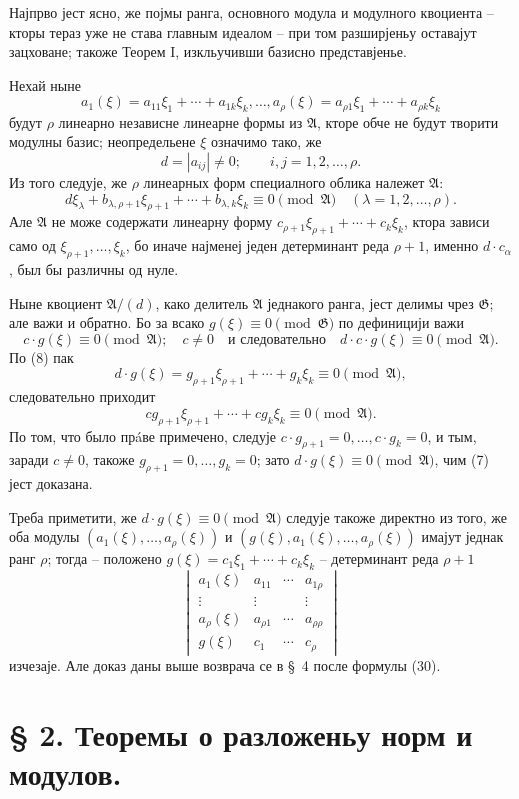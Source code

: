 \documentclass[11pt]{article}
\providecommand{\Amod}{\mathfrak A}
\providecommand{\Gmod}{\mathfrak G}
\providecommand{\zero}[1]{\equiv 0\pmod{#1}}
\begin{document}
Најпрво јест ясно, же појмы ранга, основного модула и модулного квоциента -- кторы тераз уже не става главным идеалом -- при том разширјеньу оставајут зацховане; такоже Теорем I, изкльучивши базисно представјенье.

Нехай ныне
\[
 a_1(\xi)=a_{11}\xi_1+\cdots+a_{1k}\xi_k,\ldots,
 a_\rho(\xi)=a_{\rho1}\xi_1+\cdots+a_{\rho k}\xi_k
\]
будут $\rho$ линеарно независне линеарне формы из $\Amod$, кторе обче не будут творити модулны базис; неопредельене $\xi$ означимо тако, же
\[
 d=|a_{ij}|\ne0;\qquad i,j=1,2,\ldots,\rho.
\]
Из того следује, же $\rho$ линеарных форм специалного облика належет $\Amod$:
\begin{equation}
 d\xi_\lambda+b_{\lambda,\rho+1}\xi_{\rho+1}+\cdots+b_{\lambda,k}\xi_k\zero{\Amod}
 \quad(\lambda=1,2,\ldots,\rho).
\tag{8}
\end{equation}
Але $\Amod$ не може содержати линеарну форму $c_{\rho+1}\xi_{\rho+1}+\cdots+c_k\xi_k$, ктора зависи само од $\xi_{\rho+1},\ldots,\xi_k$, бо иначе најменеј једен детерминант реда $\rho+1$, именно $d\cdot c_\alpha$, был бы различны од нуле.

Ныне квоциент $\Amod/(d)$, како делитель $\Amod$ једнакого ранга, јест делимы чрез $\Gmod$; але важи и обратно. Бо за всако $g(\xi)\zero{\Gmod}$ по дефиницији важи
\[
 c\cdot g(\xi)\zero{\Amod};\quad c\ne0
 \quad\text{и следовательно}\quad d\cdot c\cdot g(\xi)\zero{\Amod}.
\]
По (8) пак
\[
 d\cdot g(\xi)=g_{\rho+1}\xi_{\rho+1}+\cdots+g_k\xi_k\zero{\Amod},
\]
следовательно приходит
\[
 c g_{\rho+1}\xi_{\rho+1}+\cdots+c g_k\xi_k\zero{\Amod}.
\]
По том, что было прáве примечено, следује $c\cdot g_{\rho+1}=0,\ldots,c\cdot g_k=0$, и тым, заради $c\ne0$, такоже $g_{\rho+1}=0,\ldots,g_k=0$; зато $d\cdot g(\xi)\zero{\Amod}$, чим (7) јест доказана.

Треба приметити, же $d\cdot g(\xi)\zero{\Amod}$ следује такоже директно из того, же оба модулы $(a_1(\xi),\ldots,a_\rho(\xi))$ и $(g(\xi),a_1(\xi),\ldots,a_\rho(\xi))$ имајут једнак ранг $\rho$; тогда -- положено $g(\xi)=c_1\xi_1+\cdots+c_k\xi_k$ -- детерминант реда $\rho+1$
\[
\begin{vmatrix}
 a_1(\xi)&a_{11}&\cdots&a_{1\rho}\\
 \vdots&\vdots&&\vdots\\
 a_\rho(\xi)&a_{\rho1}&\cdots&a_{\rho\rho}\\
 g(\xi)&c_1&\cdots&c_\rho
\end{vmatrix}
\]
изчезаје. Але доказ даны выше возврача се в §~4 после формулы (30).


\section*{§ 2. Теоремы о разложеньу норм и модулов.}
\end{document}
